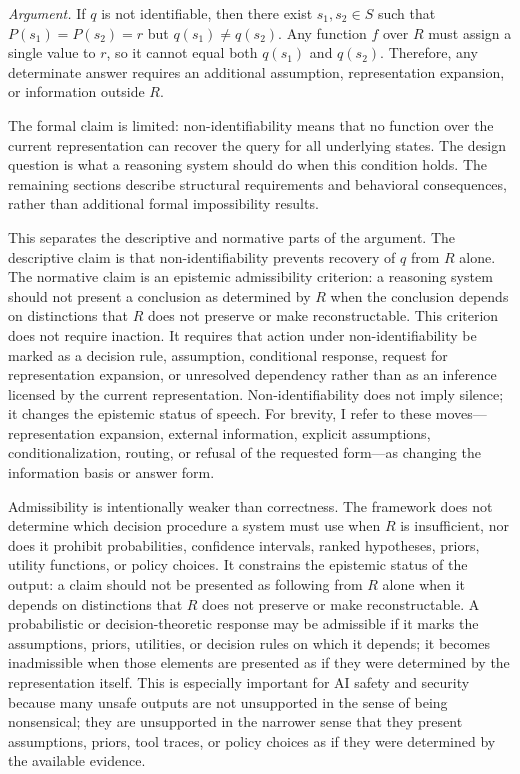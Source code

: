 \documentclass[11pt]{article}
\begin{document}
\emph{Argument.}
If $q$ is not identifiable, then there exist $s_1,s_2\in S$ such that $P(s_1)=P(s_2)=r$ but $q(s_1)\neq q(s_2)$. Any function $f$ over $R$ must assign a single value to $r$, so it cannot equal both $q(s_1)$ and $q(s_2)$. Therefore, any determinate answer requires an additional assumption, representation expansion, or information outside $R$.

The formal claim is limited: non-identifiability means that no function over the current representation can recover the query for all underlying states. The design question is what a reasoning system should do when this condition holds. The remaining sections describe structural requirements and behavioral consequences, rather than additional formal impossibility results.

This separates the descriptive and normative parts of the argument. The descriptive claim is that non-identifiability prevents recovery of $q$ from $R$ alone. The normative claim is an epistemic admissibility criterion: a reasoning system should not present a conclusion as determined by $R$ when the conclusion depends on distinctions that $R$ does not preserve or make reconstructable. This criterion does not require inaction. It requires that action under non-identifiability be marked as a decision rule, assumption, conditional response, request for representation expansion, or unresolved dependency rather than as an inference licensed by the current representation. Non-identifiability does not imply silence; it changes the epistemic status of speech. For brevity, I refer to these moves---representation expansion, external information, explicit assumptions, conditionalization, routing, or refusal of the requested form---as changing the information basis or answer form.

Admissibility is intentionally weaker than correctness. The framework does not determine which decision procedure a system must use when $R$ is insufficient, nor does it prohibit probabilities, confidence intervals, ranked hypotheses, priors, utility functions, or policy choices. It constrains the epistemic status of the output: a claim should not be presented as following from $R$ alone when it depends on distinctions that $R$ does not preserve or make reconstructable. A probabilistic or decision-theoretic response may be admissible if it marks the assumptions, priors, utilities, or decision rules on which it depends; it becomes inadmissible when those elements are presented as if they were determined by the representation itself. This is especially important for AI safety and security because many unsafe outputs are not unsupported in the sense of being nonsensical; they are unsupported in the narrower sense that they present assumptions, priors, tool traces, or policy choices as if they were determined by the available evidence.
\end{document}
